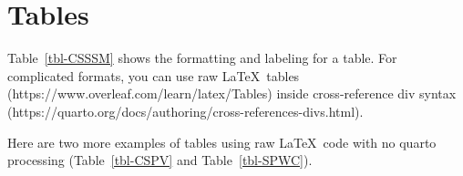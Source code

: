 \documentclass[
  dissertation]{bsu-cs}
\begin{document}
\section{Tables}\label{tables}

Table~\ref{tbl-CSSSM} shows the formatting and labeling for a table. For
complicated formats, you can use raw \LaTeX~tables
(https://www.overleaf.com/learn/latex/Tables) inside cross-reference div
syntax (https://quarto.org/docs/authoring/cross-references-divs.html).

\begin{table}

\caption{\label{tbl-CSSSM}Complexity of Selection and Search in Sorted
Matrices}


\end{table}%

Here are two more examples of tables using raw \LaTeX~code with no
quarto processing (Table~\ref{tbl-CSPV} and Table~\ref{tbl-SPWC}).

\begin{table}

\caption{\label{tbl-CSPV}Comparison of Slow MPI Version and the Fast MPI Version}


\end{table}%
\end{document}
